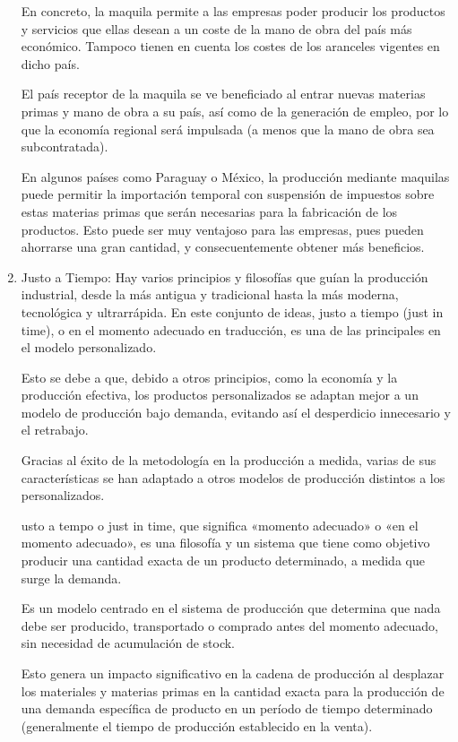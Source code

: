 \documentclass[letterpaper,12pt]{article}
\begin{document}
\begin{sloppypar}
\begin{enumerate}
    En concreto, la maquila permite a las empresas poder producir los productos y servicios que ellas desean a un coste de la mano de obra del país más económico. Tampoco tienen en cuenta los costes de los aranceles vigentes en dicho país.
    
    El país receptor de la maquila se ve beneficiado al entrar nuevas materias primas y mano de obra a su país, así como de la generación de empleo, por lo que la economía regional será impulsada (a menos que la mano de obra sea subcontratada).
    
    En algunos países como Paraguay o México, la producción mediante maquilas puede permitir la importación temporal con suspensión de impuestos sobre estas materias primas que serán necesarias para la fabricación de los productos. Esto puede ser muy ventajoso para las empresas, pues pueden ahorrarse una gran cantidad, y consecuentemente obtener más beneficios.

    \item Justo a Tiempo: Hay varios principios y filosofías que guían la producción industrial, desde la más antigua y tradicional hasta la más moderna, tecnológica y ultrarrápida. En este conjunto de ideas, justo a tiempo (just in time), o en el momento adecuado en traducción, es una de las principales en el modelo personalizado.

    Esto se debe a que, debido a otros principios, como la economía y la producción efectiva, los productos personalizados se adaptan mejor a un modelo de producción bajo demanda, evitando así el desperdicio innecesario y el retrabajo.
    
    Gracias al éxito de la metodología en la producción a medida, varias de sus características se han adaptado a otros modelos de producción distintos a los personalizados.

    usto a tempo o just in time, que significa «momento adecuado» o «en el momento adecuado», es una filosofía y un sistema que tiene como objetivo producir una cantidad exacta de un producto determinado, a medida que surge la demanda.

Es un modelo centrado en el sistema de producción que determina que nada debe ser producido, transportado o comprado antes del momento adecuado, sin necesidad de acumulación de stock.

Esto genera un impacto significativo en la cadena de producción al desplazar los materiales y materias primas en la cantidad exacta para la producción de una demanda específica de producto en un período de tiempo determinado (generalmente el tiempo de producción establecido en la venta).


\end{enumerate}
\end{sloppypar}
\end{document}
